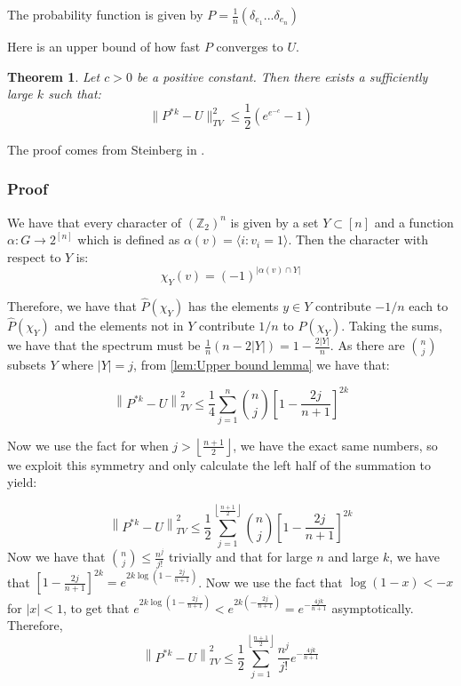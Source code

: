 \documentclass[]{article}
\newtheorem{theorem}{Theorem}
\theoremstyle{definition}
\numberwithin{theorem}{section}
\numberwithin{equation}{section}
\begin{document}
The probability function is given by $P = \frac{1}{n} \left(\delta_{e_1} ... \delta_{e_n}\right)$

Here is an upper bound of how fast $P$ converges to $U$. 
\begin{theorem}
	Let $c > 0$ be a positive constant. Then there exists a sufficiently large $k$ such that:
	\begin{equation}
		\|P^{\ast k} - U\|^2_{TV} \leq \frac{1}{2} (e^{e^{-c}} - 1)
	\end{equation}
\end{theorem}

The proof comes from Steinberg in \cite{steinbergProbabilityRandomWalks2012}. 

\subsubsection{Proof}
We have that every character of $\left(\mathbb{Z}_2\right)^n$ is given by a set $Y \subset [n]$ and a function $\alpha: G \rightarrow 2^{[n]}$ which is defined as $\alpha(v) = \langle i : v_i = 1 \rangle$. Then the character with respect to $Y$ is:
\begin{equation}
	\chi_Y(v) = (-1)^{|\alpha(v) \cap Y|}
\end{equation}

Therefore, we have that $\hat{P}(\chi_Y)$ has the elements $y \in Y$ contribute $ -1/n$ each to $\hat{P}(\chi_Y)$ and the elements not in $Y$ contribute $1/n$ to $\hat{P}(\chi_Y)$. Taking the sums, we have that the spectrum must be $\frac{1}{n}(n - 2 |Y|) = 1 - \frac{2|Y|}{n}$. As there are $\binom{n}{j}$ subsets $Y$ where $|Y| = j$,
from \cref{lem:Upper bound lemma} we have that:

\begin{equation}
	\left\| P^{\ast k} - U \right\|_{TV}^2 \leq \frac{1}{4} \sum_{j = 1}^{n}\binom{n}{j} \left[1 - \frac{2j}{n+1}\right]^{2k}
\end{equation}

Now we use the fact for when $j > \left\lfloor \frac{n + 1}{2} \right\rfloor$, we have the exact same numbers, so we exploit this symmetry and only calculate the left half of the summation to yield:

\begin{equation}
	\left\| P^{\ast k} - U \right\|_{TV}^2 \leq \frac{1}{2} \sum_{j = 1}^{\left\lfloor \frac{n + 1}{2} \right\rfloor}\binom{n}{j} \left[1 - \frac{2j}{n+1}\right]^{2k}
\end{equation}
Now we have that $\binom{n}{j} \leq \frac{n^j}{j!}$ trivially and that for large $n$ and large $k$, we have that $\left[1 - \frac{2j}{n+1}\right]^{2k} = e^{2k \log \left(1 - \frac{2j}{n+1}\right)}$. Now we use the fact that $\log(1 - x) < - x $ for $|x| < 1$, to get that $e^{2k \log \left(1 - \frac{2j}{n+1}\right)} < e^{2k(- \frac{2j}{n+1})} = e^{-\frac{4jk}{n+1}}$ asymptotically. 
Therefore, 
\begin{equation}
	\left\| P^{\ast k} - U \right\|_{TV}^2 \leq \frac{1}{2} \sum_{j = 1}^{\left\lfloor \frac{n + 1}{2} \right\rfloor}\frac{n^j}{j!} e^{-\frac{4jk}{n+1}}
\end{equation}
\end{document}
